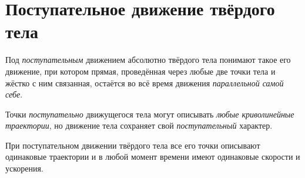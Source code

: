 \section{Поступательное движение твёрдого тела}

Под \textit{поступательным} движением абсолютно твёрдого тела понимают такое его
движение, при котором прямая, проведённая через любые две точки тела и жёстко с
ним связанная, остаётся во всё время движения \textit{параллельной самой себе}.

Точки \textit{поступательно} движущегося тела могут описывать \textit{любые
криволинейные траектории}, но движение тела сохраняет свой
\textit{поступательный} характер.

\begin{theorem}
  При поступательном движении твёрдого тела все его точки описывают одинаковые
  траектории и в любой момент времени имеют одинаковые скорости и ускорения.
\end{theorem}

